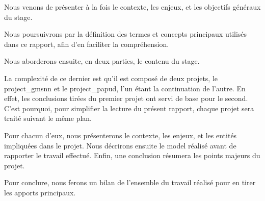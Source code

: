 
Nous venons de présenter à la fois le contexte, les enjeux, et les objectifs généraux du stage.

Nous poursuivrons par la définition des termes et concepts principaux utilisés dans ce rapport, afin d'en faciliter la compréhension.

Nous aborderons ensuite, en deux parties, le contenu du stage.

La complexité de ce dernier est qu'il est composé de deux projets, le \gls{project_gmsnn} et le \gls{project_papud}, l'un étant la continuation de l'autre. En effet, les conclusions tirées du premier projet ont servi de base pour le second. C'est pourquoi, pour simplifier la lecture du présent rapport, chaque projet sera traité suivant le même plan.

Pour chacun d'eux, nous présenterons le contexte, les enjeux, et les entités impliquées dans le projet. Nous décrirons ensuite le \gls{model} réalisé avant de rapporter le travail effectué. Enfin, une conclusion résumera les points majeurs du projet.

Pour conclure, nous ferons un bilan de l'ensemble du travail réalisé pour en tirer les apports principaux.



